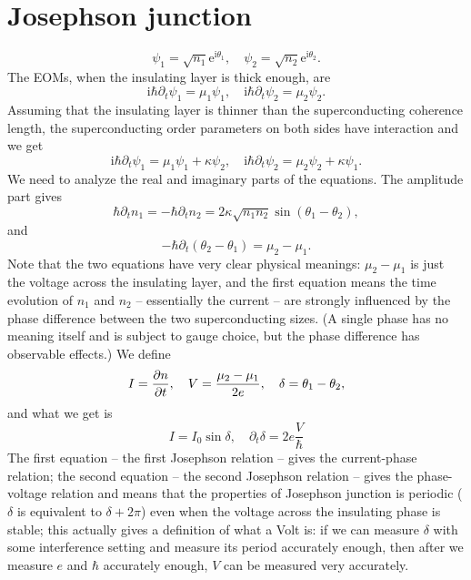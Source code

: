 \documentclass[hyperref, a4paper]{article}
\newcommand*{\ii}{\mathrm{i}}
\newcommand*{\ee}{\mathrm{e}}
\begin{document}
\section{Josephson junction}

\begin{equation}
    \psi_1 = \sqrt{n_1} \ee^{\ii \theta_1}, \quad 
    \psi_2 = \sqrt{n_2} \ee^{\ii \theta_2}.
\end{equation}
The EOMs, when the insulating layer is thick enough, are 
\begin{equation}
    \ii \hbar \partial_t \psi_1 =
    \mu_1 \psi_1, \quad 
    \ii \hbar \partial_t \psi_2 =
    \mu_2 \psi_2.
\end{equation}
Assuming that the insulating layer is thinner than the superconducting coherence length,
the superconducting order parameters on both sides have interaction and we get 
\begin{equation}
    \ii \hbar \partial_t \psi_1 =
    \mu_1 \psi_1 + \kappa \psi_2, \quad 
    \ii \hbar \partial_t \psi_2 =
    \mu_2 \psi_2 + \kappa \psi_1.
\end{equation}
We need to analyze the real and imaginary parts of the equations.
The amplitude part gives 
\begin{equation}
    \hbar \partial_t n_1 = - \hbar \partial_t n_2 = 2 \kappa \sqrt{n_1 n_2} \sin (\theta_1 - \theta_2),
\end{equation}
and 
\begin{equation}
    - \hbar \partial_t (\theta_2 - \theta_1) = \mu_2 - \mu_1.
\end{equation}
Note that the two equations have very clear physical meanings:
$\mu_2 - \mu_1$ is just the voltage across the insulating layer, 
and the first equation means the time evolution of $n_1$ and $n_2$ -- 
essentially the current -- 
are strongly influenced by the phase difference between the two superconducting sizes.
(A single phase has no meaning itself and is subject to gauge choice, 
but the phase difference has observable effects.)
We define 
\begin{equation}
    I = \pdv{n}{t}, \quad V = \frac{\mu_2 - \mu_1}{2e}, \quad 
    \delta = \theta_1 - \theta_2,
\end{equation}
and what we get is 
\begin{equation}
    I = I_0 \sin \delta, \quad 
    \partial_t \delta = 2 e \frac{V}{\hbar}
\end{equation}
The first equation -- the first Josephson relation -- 
gives the current-phase relation;
the second equation -- the second Josephson relation -- 
gives the phase-voltage relation
and means that the properties of Josephson junction 
is periodic ($\delta$ is equivalent to $\delta + 2\pi$)
even when the voltage across the insulating phase is stable;
this actually gives a definition of what a Volt is:
if we can measure $\delta$ with some interference setting 
and measure its period accurately enough, 
then after we measure $e$ and $\hbar$ accurately enough,
$V$ can be measured very accurately.
\end{document}
